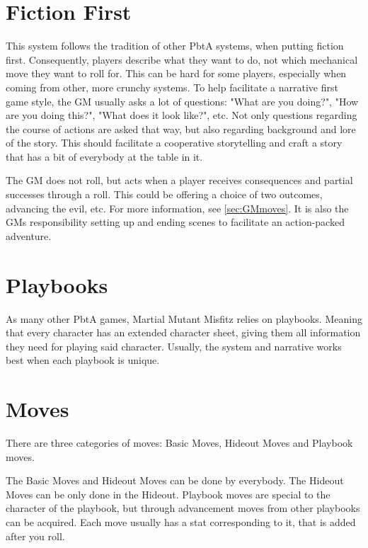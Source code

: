 \documentclass{book}
\begin{document}
\section*{Fiction First}
This system follows the tradition of other PbtA systems, when putting fiction first.
Consequently, players describe what they want to do, not which mechanical move they want to roll for.
This can be hard for some players, especially when coming from other, more crunchy systems.
To help facilitate a narrative first game style, the GM usually asks a lot of questions: "What are you doing?", "How are you doing this?", "What does it look like?", etc.
Not only questions regarding the course of actions are asked that way, but also regarding background and lore of the story.
This should facilitate a cooperative storytelling and craft a story that has a bit of everybody at the table in it.

The GM does not roll, but acts when a player receives consequences and partial successes through a roll.
This could be offering a choice of two outcomes, advancing the evil, etc.
For more information, see \autoref{sec:GMmoves}.
It is also the GMs responsibility setting up and ending scenes to facilitate an action-packed adventure.

\section*{Playbooks}
As many other PbtA games, Martial Mutant Misfitz relies on playbooks. Meaning that every character has an extended character sheet, giving them all information they need for playing said character.
Usually, the system and narrative works best when each playbook is unique.

\section*{Moves}
There are three categories of moves: Basic Moves, Hideout Moves and Playbook moves.

The Basic Moves and Hideout Moves can be done by everybody.
The Hideout Moves can be only done in the Hideout.
Playbook moves are special to the character of the playbook, but through advancement moves from other playbooks can be acquired.
Each move usually has a stat corresponding to it, that is added after you roll.
\end{document}
